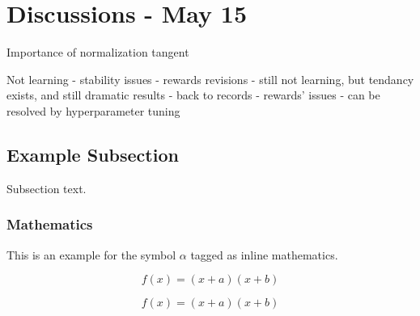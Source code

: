 \documentclass[preprint,12pt]{elsarticle}
\begin{document}
\section{Discussions - May 15}
Importance of normalization
tangent 

Not learning - stability issues - rewards revisions - still not learning, but tendancy exists, and still dramatic results - back to records - rewards' issues - can be resolved by hyperparameter tuning 


\subsection{Example Subsection}
\label{subsec1}

Subsection text.


\subsubsection{Mathematics}
This is an example for the symbol $\alpha$ tagged as inline mathematics.

\begin{equation}
f(x) = (x+a)(x+b)
\end{equation}

\begin{equation*}
f(x) = (x+a)(x+b)
\end{equation*}
\end{document}
